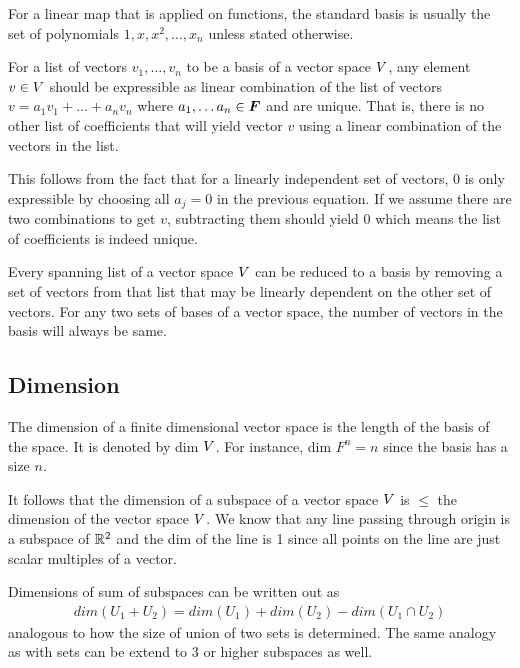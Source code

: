 \documentclass[../../linear_algebra.tex]{subfiles}
\begin{document}
For a linear map that is applied on functions, the standard basis is usually the set of polynomials $1, x, x^{2}, \ldots, x_{n}$ unless stated otherwise.\newline

For a list of vectors $v_{1}, \ldots, v_{n}$ to be a basis of a vector space $V$, any element $v \in V$ should be expressible as linear combination of the list of vectors $v = a_{1}v_{1} + \ldots + a_{n}v_{n}$ where $a_{1}, \ldots a_{n} \in \bm{F}$ and are unique. That is, there is no other list of coefficients that will yield vector $v$ using a linear combination of the vectors in the list.\newline

This follows from the fact that for a linearly independent set of vectors, $0$ is only expressible by choosing all $a_{j} = 0$ in the previous equation. If we assume there are two combinations to get $v$, subtracting them should yield $0$ which means the list of coefficients is indeed unique.\newline

Every spanning list of a vector space $V$ can be reduced to a basis by removing a set of vectors from that list that may be linearly dependent on the other set of vectors. For any two sets of bases of a vector space, the number of vectors in the basis will always be same.

\subsection{Dimension}
The dimension of a finite dimensional vector space is the length of the basis of the space. It is denoted by dim $V$. For instance, dim $F^{n} = n$ since the basis has a size $n$.\newline

It follows that the dimension of a subspace of a vector space $V$ is $\leq$ the dimension of the vector space $V$. We know that any line passing through origin is a subspace of $\mathbb{R}^{2}$ and the dim of the line is 1 since all points on the line are just scalar multiples of a vector.\newline

Dimensions of sum of subspaces can be written out as
\begin{align*}
    dim(U_{1} + U_{2}) = dim(U_{1}) + dim(U_{2}) - dim(U_{1} \cap U_{2})
\end{align*}
analogous to how the size of union of two sets is determined. The same analogy as with sets can be extend to 3 or higher subspaces as well.
\end{document}
